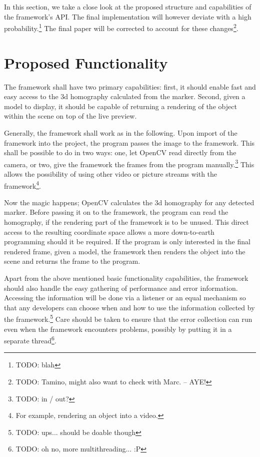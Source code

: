 In this section, we take a close look at the proposed structure and capabilities of the framework's API.
The final implementation will however deviate with a high probability.\footnote{TODO: blah}
The final paper will be corrected to account for these changes\footnote{TODO: Tamino, might also want to check with Marc. – AYE!}.

\section{Proposed Functionality}

The framework shall have two primary capabilities: first, it should enable fast and easy access to the 3d homography calculated from the marker.
Second, given a model to display, it should be capable of returning a rendering of the object within the scene on top of the live preview.

Generally, the framework shall work as in the following.
Upon import of the framework into the project, the program passes the image to the framework.
This shall be possible to do in two ways: one, let OpenCV read directly from the camera, or two, give the framework the frames from the program manually.\footnote{TODO: in / out?}
This allows the possibility of using other video or picture streams with the framework\footnote{For example, rendering an object into a video.}.

Now the magic happens; OpenCV calculates the 3d homography for any detected marker.
Before passing it on to the framework, the program can read the homography, if the rendering part of the framework is to be unused.
This direct access to the resulting coordinate space allows a more down-to-earth programming should it be required.
If the program is only interested in the final rendered frame, given a model, the framework then renders the object into the scene and returns the frame to the program.

Apart from the above mentioned basic functionality capabilities, the framework should also handle the easy gathering of performance and error information.
Accessing the information will be done via a listener or an equal mechanism so that any developers can choose when and how to use the information collected by the framework.\footnote{TODO: ups... should be doable though}
Care should be taken to ensure that the error collection can run even when the framework encounters problems, possibly by putting it in a separate thread\footnote{TODO: oh no, more multithreading... :P}.

